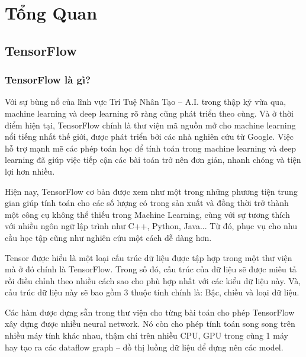 
\chapter{Tổng Quan} %

\label{Chapter2} %

\newcommand{\keyword}[1]{\textbf{#1}}
\newcommand{\tabhead}[1]{\textbf{#1}}
\newcommand{\code}[1]{\texttt{#1}}
\newcommand{\file}[1]{\texttt{\bfseries#1}}
\newcommand{\option}[1]{\texttt{\itshape#1}}

\section{TensorFlow}
\subsection{TensorFlow là gì?}
Với sự bùng nổ của lĩnh vực Trí Tuệ Nhân Tạo – A.I. trong thập kỷ vừa qua, machine learning và deep learning rõ ràng cũng phát triển theo cùng. 
Và ở thời điểm hiện tại, TensorFlow chính là thư viện mã nguồn mở cho machine learning nổi tiếng nhất thế giới, được phát triển bởi các nhà nghiên 
cứu từ Google. Việc hỗ trợ mạnh mẽ các phép toán học để tính toán trong machine learning và deep learning đã giúp việc tiếp cận các bài toán trở 
nên đơn giản, nhanh chóng và tiện lợi hơn nhiều. 

Hiện nay, TensorFlow cơ bản được xem như một trong những phương tiện trung gian giúp tính toán cho các số lượng có trong sản xuất và đồng thời trở 
thành một công cụ không thể thiếu trong Machine Learning, cùng với sự tương thích với nhiều ngôn ngữ lập trình như C++, Python, Java... 
Từ đó, phục vụ cho nhu cầu học tập cũng như nghiên cứu một cách dễ dàng hơn. 

Tensor được hiểu là một loại cấu trúc dữ liệu được tập hợp 
trong một thư viện mà ở đó chính là TensorFlow. Trong số đó, cấu trúc của dữ liệu sẽ được miêu tả rồi điều chỉnh theo nhiều cách sao cho phù hợp 
nhất với các kiểu dữ liệu này. Và, cấu trúc dữ liệu này sẽ bao gồm 3 thuộc tính chính là: Bậc, chiều và loại dữ liệu. 


Các hàm được dựng sẵn trong thư viện cho từng bài toán cho phép TensorFlow xây dựng được nhiều neural network. 
Nó còn cho phép tính toán song song trên nhiều máy tính khác nhau, thậm chí trên nhiều CPU, GPU trong cùng 1 máy hay tạo ra các dataflow graph – đồ 
thị luồng dữ liệu để dựng nên các model.






